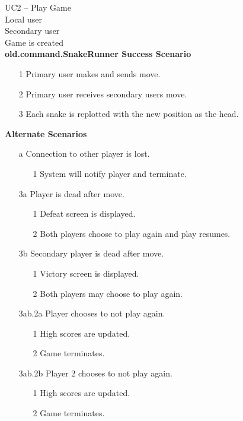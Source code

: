 \documentclass[titlepage]{article}
\begin{document}
	\textbf{} UC2 -- Play Game\\
	\textbf{} Local user\\
	\textbf{} Secondary user\\
	\textbf{} Game is created\\
	\textbf{old.command.SnakeRunner Success Scenario}
	\begin{enumerate}
		\itemsep0em 
		\item[1] Primary user makes and sends move.
		\item[2] Primary user receives secondary users move.
		\item[3] Each snake is replotted with the new position as the head.
	\end{enumerate}
	\textbf{Alternate Scenarios}
	\begin{enumerate}
		\itemsep0em 
		\item[a]Connection to other player is lost.
		\begin{enumerate}
			\itemsep0em 
			\item[1]System will notify player and terminate.
		\end{enumerate}
		\item[3a]Player is dead after move.
		\begin{enumerate}
			\itemsep0em 
			\item[1]Defeat screen is displayed.
			\item[2]Both players choose to play again and play resumes.
		\end{enumerate}
		\item[3b]Secondary player is dead after move.
		\begin{enumerate}
			\itemsep0em 
			\item[1]Victory screen is displayed.
			\item[2]Both players may choose to play again.
		\end{enumerate}
				\item[3ab.2a]Player chooses to not play again.
				\begin{enumerate}
					\itemsep0em 
					\item[1]High scores are updated.
					\item[2]Game terminates.
				\end{enumerate}
				\item[3ab.2b]Player 2 chooses to not play again.
				\begin{enumerate}
					\itemsep0em 
					\item[1]High scores are updated.
					\item[2]Game terminates.
				\end{enumerate}
	\end{enumerate}
		
\end{document}
